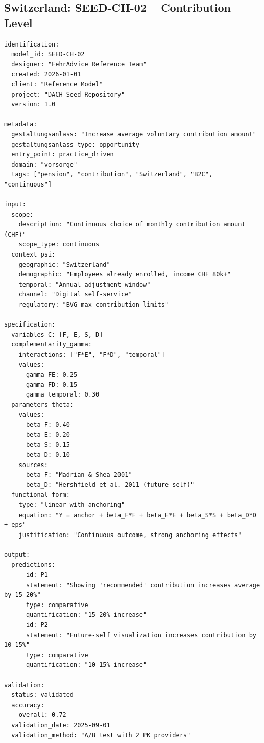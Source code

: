 \subsection{Switzerland: SEED-CH-02 -- Contribution Level}

\begin{tcolorbox}[colback=white, colframe=red!50!black,
    title=SEED-CH-02: Voluntary Contribution Amount (Switzerland)]
\begin{verbatim}
identification:
  model_id: SEED-CH-02
  designer: "FehrAdvice Reference Team"
  created: 2026-01-01
  client: "Reference Model"
  project: "DACH Seed Repository"
  version: 1.0

metadata:
  gestaltungsanlass: "Increase average voluntary contribution amount"
  gestaltungsanlass_type: opportunity
  entry_point: practice_driven
  domain: "vorsorge"
  tags: ["pension", "contribution", "Switzerland", "B2C", "continuous"]

input:
  scope:
    description: "Continuous choice of monthly contribution amount (CHF)"
    scope_type: continuous
  context_psi:
    geographic: "Switzerland"
    demographic: "Employees already enrolled, income CHF 80k+"
    temporal: "Annual adjustment window"
    channel: "Digital self-service"
    regulatory: "BVG max contribution limits"

specification:
  variables_C: [F, E, S, D]
  complementarity_gamma:
    interactions: ["F*E", "F*D", "temporal"]
    values:
      gamma_FE: 0.25
      gamma_FD: 0.15
      gamma_temporal: 0.30
  parameters_theta:
    values:
      beta_F: 0.40
      beta_E: 0.20
      beta_S: 0.15
      beta_D: 0.10
    sources:
      beta_F: "Madrian & Shea 2001"
      beta_D: "Hershfield et al. 2011 (future self)"
  functional_form:
    type: "linear_with_anchoring"
    equation: "Y = anchor + beta_F*F + beta_E*E + beta_S*S + beta_D*D + eps"
    justification: "Continuous outcome, strong anchoring effects"

output:
  predictions:
    - id: P1
      statement: "Showing 'recommended' contribution increases average by 15-20%"
      type: comparative
      quantification: "15-20% increase"
    - id: P2
      statement: "Future-self visualization increases contribution by 10-15%"
      type: comparative
      quantification: "10-15% increase"

validation:
  status: validated
  accuracy:
    overall: 0.72
  validation_date: 2025-09-01
  validation_method: "A/B test with 2 PK providers"
\end{verbatim}
\end{tcolorbox}

